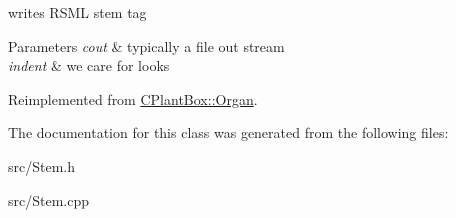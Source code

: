 writes R\+S\+ML stem tag


\begin{DoxyParams}{Parameters}
{\em cout} & typically a file out stream \\
\hline
{\em indent} & we care for looks \\
\hline
\end{DoxyParams}


Reimplemented from \hyperlink{classCPlantBox_1_1Organ_acdad546c90e915b61ac3606f1f841ba1}{C\+Plant\+Box\+::\+Organ}.



The documentation for this class was generated from the following files\+:\begin{DoxyCompactItemize}
\item 
src/Stem.\+h\item 
src/Stem.\+cpp\end{DoxyCompactItemize}
